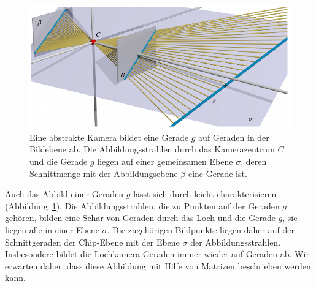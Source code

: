 \begin{figure}
\centering
\includegraphics{applications/kamera/geraden.pdf}
\caption{Eine abstrakte Kamera bildet eine Gerade $g$ auf Geraden 
in der Bildebene ab.
Die Abbildungsstrahlen durch das Kamerazentrum $C$ und die Gerade $g$
liegen auf einer gemeinsamen Ebene $\sigma$, deren Schnittmenge mit 
der Abbildungsebene $\beta$ eine Gerade ist.
\label{applications:kamera:geraden}}
\end{figure}
Auch das Abbild einer Geraden $g$ lässt sich durch leicht charakterisieren
(Abbildung~\ref{applications:kamera:geraden}).
Die Abbildungsstrahlen, die zu Punkten auf der Geraden $g$ gehören,
bilden eine Schar von Geraden durch das Loch und die Gerade $g$,
sie liegen alle in einer Ebene $\sigma$.
Die zugehörigen Bildpunkte liegen daher auf der Schnittgeraden der
Chip-Ebene mit der Ebene $\sigma$ der Abbildungsstrahlen.
Insbesondere bildet die Lochkamera Geraden immer wieder auf Geraden ab.
Wir erwarten daher, dass diese Abbildung mit Hilfe von Matrizen
beschrieben werden kann.
